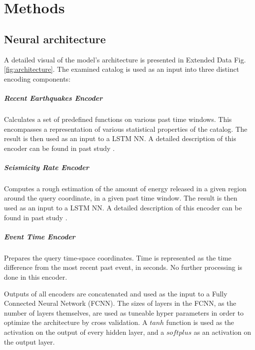 \documentclass[pdflatex]{sn-jnl}
\begin{document}
\let\oldthebibliography=\thebibliography
\let\oldendthebibliography=\endthebibliography
\renewenvironment{thebibliography}[1]{
    \oldthebibliography{#1}
    \setcounter{enumiv}{34}
}{\oldendthebibliography}

\newpage
\unnumbered

\unnumbered
\section{Methods}
\subsection{Neural architecture}
A detailed visual of the model's architecture is presented in Extended Data Fig. \ref{fig:architecture}. The examined catalog is used as an input into three distinct encoding components:
\subparagraph{\textbf{Recent Earthquakes Encoder}} Calculates a set of predefined functions on various past time windows. This encompasses a representation of various statistical properties of the catalog. The result is then used as an input to a LSTM NN. A detailed description of this encoder can be found in past study \cite{zlydenko_neural_2023}. 

\subparagraph{\textbf{Seismicity Rate Encoder}} Computes a rough estimation of the amount of energy released in a given region around the query coordinate, in a given past time window. The result is then used as an input to a LSTM NN. A detailed description of this encoder can be found in past study \cite{zlydenko_neural_2023}.

\subparagraph{\textbf{Event Time Encoder}} Prepares the query time-space coordinates. Time is represented as the time difference from the most recent past event, in seconds. No further processing is done in this encoder.



Outputs of all encoders are concatenated and used as the input to a Fully Connected Neural Network (FCNN). The sizes of layers in the FCNN, as the number of layers themselves, are used as tuneable hyper parameters in order to optimize the architecture by cross validation. A $tanh$ function is used as the activation on the output of every hidden layer, and a $softplus$ as an activation on the output layer. 
\end{document}
